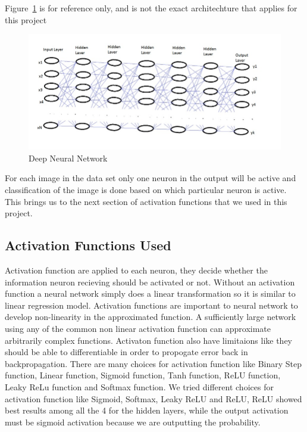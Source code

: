 Figure~\ref{f:Deep Neural Network} is for reference only, and is not the exact 
architechture that applies for this project

\begin{figure}[!ht]
        \centering\includegraphics[width=\columnwidth]
        {images/neural-network.jpeg}
        \caption{Deep Neural Network~\cite{hid-sp18-401-Neural-Network-image}}
        \label{f:Deep Neural Network}
\end{figure}


For each image in the data set only one neuron in the output will be active
and classification of the image is done based on which particular neuron is
active. This brings us to the next section of activation functions that we
used in this project.



\subsection{Activation Functions Used}

Activation function are applied to each neuron, they decide whether the
information neuron recieving should be activated or not. Without an activation
function a neural network simply does a linear transformation so it is similar
to linear regression model. Activation functions are important to neural
network to develop non-linearity in the approximated function. A sufficiently
large network using any of the common non linear activation function can
approximate arbitrarily complex functions. Activaton function also have
limitaions like they should be able to differentiable in order to propogate
error back in backpropagation. There are many choices for activation function
like Binary Step function, Linear function, Sigmoid function, Tanh function,
ReLU function, Leaky ReLu function and Softmax function. We tried different
choices for activation function like Sigmoid, Softmax, Leaky ReLU and ReLU,
ReLU showed best results among all the 4 for the hidden layers, while the
output activation must be sigmoid activation because we are outputting the
probability. 

